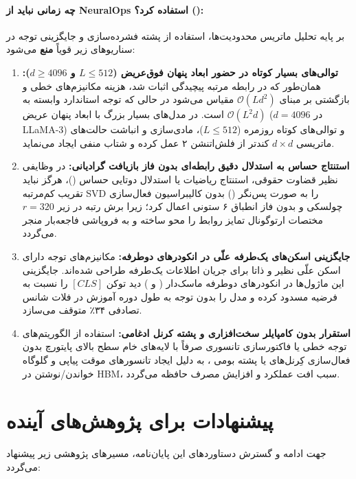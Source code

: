 \documentclass[12pt,a4paper]{report}
\theoremstyle{definition}
\begin{document}
\paragraph{چه زمانی نباید از NeuralOps استفاده کرد؟ ():}
بر پایه تحلیل ماتریس محدودیت‌ها، استفاده از پشته فشرده‌سازی و جایگزینی توجه  در سناریوهای زیر قویاً \textbf{منع} می‌شود:
\begin{enumerate}
    \item \textbf{توالی‌های بسیار کوتاه در حضور ابعاد پنهان فوق‌عریض ($L \le 512$ و $d \ge 4096$):} 
    همان‌طور که در رابطه مرتبه پیچیدگی اثبات شد، هزینه مکانیزم‌های خطی و بازگشتی بر مبنای $\mathcal{O}(L d^2)$ مقیاس می‌شود در حالی که توجه استاندارد وابسته به $\mathcal{O}(L^2 d)$ است. در مدل‌های بسیار بزرگ با ابعاد پنهان عریض ($d=4096$ در LLaMA-3) و توالی‌های کوتاه روزمره ($L \le 512$)، مادی‌سازی و انباشت حالت‌های ماتریسی $d \times d$ کندتر از فلش‌اتنشن ۲ عمل کرده و شتاب منفی ایجاد می‌نماید.
    \item \textbf{استنتاج حساس به استدلال دقیق رابطه‌ای بدون فاز بازیافت گرادیانی:}
    در وظایفی نظیر قضاوت حقوقی، استنتاج ریاضیات یا استدلال دوتایی حساس ()، هرگز نباید تقریب کم‌مرتبه SVD را به صورت پس‌نگر () بدون کالیبراسیون فعال‌سازی چولسکی و بدون فاز انطباق ۶ ستونی اعمال کرد؛ زیرا برش رتبه در زیر $r=320$ مختصات ارتوگونال تمایز روابط را محو ساخته و به فروپاشی فاجعه‌بار منجر می‌گردد.
    \item \textbf{جایگزینی اسکن‌های یک‌طرفه علّی در انکودرهای دوطرفه:}
    مکانیزم‌های توجه دارای اسکن علّی نظیر  و  ذاتا برای جریان اطلاعات یک‌طرفه طراحی شده‌اند. جایگزینی این ماژول‌ها در انکودرهای دوطرفه ماسک‌دار ( و ) دید توکن $[CLS]$ را نسبت به فرضیه مسدود کرده و مدل را بدون توجه به طول دوره آموزش در فلات شانس تصادفی ۳۴٪ متوقف می‌سازد.
    \item \textbf{استقرار بدون کامپایلر سخت‌افزاری و پشته کرنل ادغامی:}
    استفاده از الگوریتم‌های توجه خطی یا فاکتورسازی تانسوری صرفاً با لایه‌های خام سطح بالای پایتورچ بدون فعال‌سازی کِرنل‌های  یا پشته بومی ، به دلیل ایجاد تانسورهای موقت پیاپی و گلوگاه خواندن/نوشتن در HBM، سبب افت عملکرد و افزایش مصرف حافظه می‌گردد.
\end{enumerate}

\section{پیشنهادات برای پژوهش‌های آینده}
جهت ادامه و گسترش دستاوردهای این پایان‌نامه، مسیرهای پژوهشی زیر پیشنهاد می‌گردد:
\end{document}
